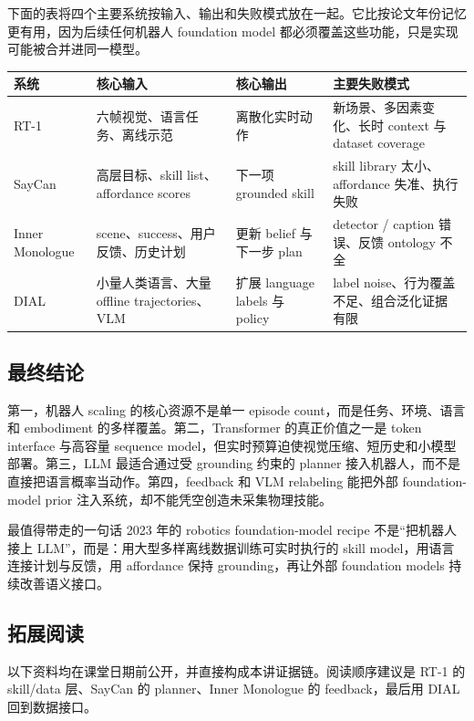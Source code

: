 \documentclass[a4paper]{article}
\begin{document}
下面的表将四个主要系统按输入、输出和失败模式放在一起。它比按论文年份记忆更有用，因为后续任何机器人 foundation model 都必须覆盖这些功能，只是实现可能被合并进同一模型。

\begin{longtable}{@{}L{0.16\textwidth}L{0.22\textwidth}L{0.23\textwidth}L{0.27\textwidth}@{}}
\toprule
系统 & 核心输入 & 核心输出 & 主要失败模式 \\
\midrule
RT-1 & 六帧视觉、语言任务、离线示范 & 离散化实时动作 & 新场景、多因素变化、长时 context 与 dataset coverage \\
SayCan & 高层目标、skill list、affordance scores & 下一项 grounded skill & skill library 太小、affordance 失准、执行失败 \\
Inner Monologue & scene、success、用户反馈、历史计划 & 更新 belief 与下一步 plan & detector / caption 错误、反馈 ontology 不全 \\
DIAL & 小量人类语言、大量 offline trajectories、VLM & 扩展 language labels 与 policy & label noise、行为覆盖不足、组合泛化证据有限 \\
\bottomrule
\end{longtable}

\subsection{最终结论}

第一，机器人 scaling 的核心资源不是单一 episode count，而是任务、环境、语言和 embodiment 的多样覆盖。第二，Transformer 的真正价值之一是 token interface 与高容量 sequence model，但实时预算迫使视觉压缩、短历史和小模型部署。第三，LLM 最适合通过受 grounding 约束的 planner 接入机器人，而不是直接把语言概率当动作。第四，feedback 和 VLM relabeling 能把外部 foundation-model prior 注入系统，却不能凭空创造未采集物理技能。

\begin{importantbox}{最值得带走的一句话}
2023 年的 robotics foundation-model recipe 不是“把机器人接上 LLM”，而是：用大型多样离线数据训练可实时执行的 skill model，用语言连接计划与反馈，用 affordance 保持 grounding，再让外部 foundation models 持续改善语义接口。
\end{importantbox}

\subsection{拓展阅读}

以下资料均在课堂日期前公开，并直接构成本讲证据链。阅读顺序建议是 RT-1 的 skill/data 层、SayCan 的 planner、Inner Monologue 的 feedback，最后用 DIAL 回到数据接口。
\end{document}
